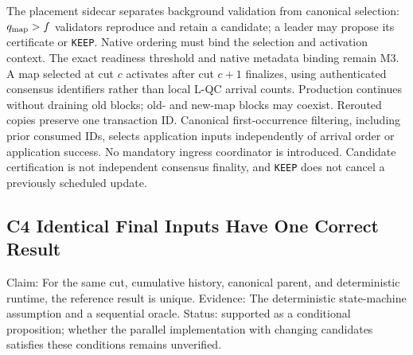 \documentclass[11pt]{article}
\begin{document}
The placement sidecar separates background validation from canonical selection: \(q_{\rm map}>f\) validators reproduce and retain a candidate; a leader may propose its certificate or \texttt{KEEP}. Native ordering must bind the selection and activation context. The exact readiness threshold and native metadata binding remain M3. A map selected at cut \(c\) activates after cut \(c+1\) finalizes, using authenticated consensus identifiers rather than local L-QC arrival counts. Production continues without draining old blocks; old- and new-map blocks may coexist. Rerouted copies preserve one transaction ID. Canonical first-occurrence filtering, including prior consumed IDs, selects application inputs independently of arrival order or application success. No mandatory ingress coordinator is introduced. Candidate certification is not independent consensus finality, and \texttt{KEEP} does not cancel a previously scheduled update.


\subsection*{C4 Identical Final Inputs Have One Correct Result}

Claim: For the same cut, cumulative history, canonical parent, and deterministic runtime, the reference result is unique. Evidence: The deterministic state-machine assumption and a sequential oracle. Status: supported as a conditional proposition; whether the parallel implementation with changing candidates satisfies these conditions remains unverified.

\end{document}

